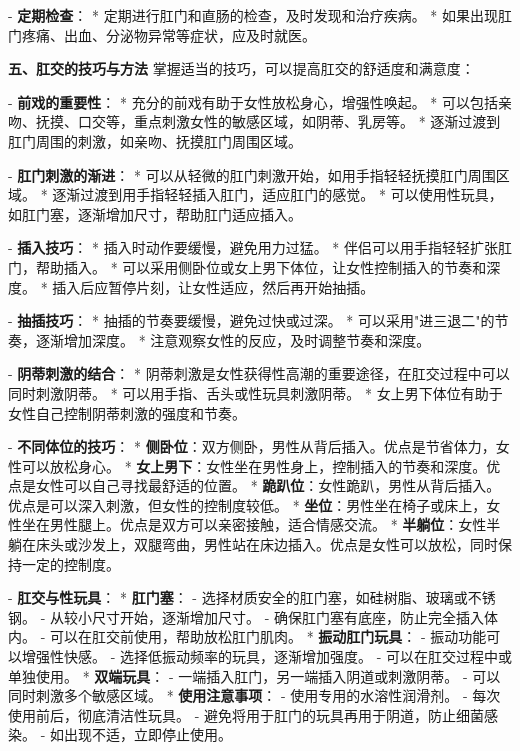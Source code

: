 \begin{enumerate}
  - \textbf{定期检查}：
    * 定期进行肛门和直肠的检查，及时发现和治疗疾病。
    * 如果出现肛门疼痛、出血、分泌物异常等症状，应及时就医。

  \textbf{五、肛交的技巧与方法}
  掌握适当的技巧，可以提高肛交的舒适度和满意度：

  - \textbf{前戏的重要性}：
    * 充分的前戏有助于女性放松身心，增强性唤起。
    * 可以包括亲吻、抚摸、口交等，重点刺激女性的敏感区域，如阴蒂、乳房等。
    * 逐渐过渡到肛门周围的刺激，如亲吻、抚摸肛门周围区域。

  - \textbf{肛门刺激的渐进}：
    * 可以从轻微的肛门刺激开始，如用手指轻轻抚摸肛门周围区域。
    * 逐渐过渡到用手指轻轻插入肛门，适应肛门的感觉。
    * 可以使用性玩具，如肛门塞，逐渐增加尺寸，帮助肛门适应插入。

  - \textbf{插入技巧}：
    * 插入时动作要缓慢，避免用力过猛。
    * 伴侣可以用手指轻轻扩张肛门，帮助插入。
    * 可以采用侧卧位或女上男下体位，让女性控制插入的节奏和深度。
    * 插入后应暂停片刻，让女性适应，然后再开始抽插。

  - \textbf{抽插技巧}：
    * 抽插的节奏要缓慢，避免过快或过深。
    * 可以采用"进三退二"的节奏，逐渐增加深度。
    * 注意观察女性的反应，及时调整节奏和深度。

  - \textbf{阴蒂刺激的结合}：
    * 阴蒂刺激是女性获得性高潮的重要途径，在肛交过程中可以同时刺激阴蒂。
    * 可以用手指、舌头或性玩具刺激阴蒂。
    * 女上男下体位有助于女性自己控制阴蒂刺激的强度和节奏。

  - \textbf{不同体位的技巧}：
    * \textbf{侧卧位}：双方侧卧，男性从背后插入。优点是节省体力，女性可以放松身心。
    * \textbf{女上男下}：女性坐在男性身上，控制插入的节奏和深度。优点是女性可以自己寻找最舒适的位置。
    * \textbf{跪趴位}：女性跪趴，男性从背后插入。优点是可以深入刺激，但女性的控制度较低。
    * \textbf{坐位}：男性坐在椅子或床上，女性坐在男性腿上。优点是双方可以亲密接触，适合情感交流。
    * \textbf{半躺位}：女性半躺在床头或沙发上，双腿弯曲，男性站在床边插入。优点是女性可以放松，同时保持一定的控制度。

  - \textbf{肛交与性玩具}：
    * \textbf{肛门塞}：
      - 选择材质安全的肛门塞，如硅树脂、玻璃或不锈钢。
      - 从较小尺寸开始，逐渐增加尺寸。
      - 确保肛门塞有底座，防止完全插入体内。
      - 可以在肛交前使用，帮助放松肛门肌肉。
    * \textbf{振动肛门玩具}：
      - 振动功能可以增强性快感。
      - 选择低振动频率的玩具，逐渐增加强度。
      - 可以在肛交过程中或单独使用。
    * \textbf{双端玩具}：
      - 一端插入肛门，另一端插入阴道或刺激阴蒂。
      - 可以同时刺激多个敏感区域。
    * \textbf{使用注意事项}：
      - 使用专用的水溶性润滑剂。
      - 每次使用前后，彻底清洁性玩具。
      - 避免将用于肛门的玩具再用于阴道，防止细菌感染。
      - 如出现不适，立即停止使用。


\end{enumerate}
